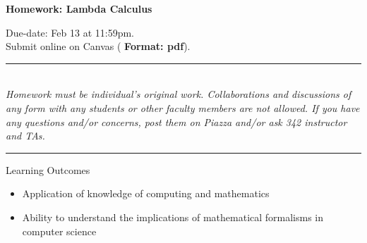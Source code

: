 \documentclass[11pt]{article}
\begin{document}
\begin{center}
{\Large\bf Homework: Lambda Calculus}

\medskip

{Due-date: Feb 13 at 11:59pm.}
\\
Submit online on Canvas (\textbf{\color{red} Format: pdf}).
\end{center}

\hrule

\textit{
\noindent
\\ Homework must be individual's original work. Collaborations and
discussions of any form with any students or other faculty members are
not allowed. If you have any questions and/or concerns, post them on
Piazza and/or ask 342 instructor and TAs.\\ 
} \hrule
\medskip


\noindent
\colorbox{timberwolf}{Learning Outcomes}
\begin{itemize}
\item Application of knowledge of computing and mathematics
\item Ability to understand the implications of mathematical formalisms
      in computer science
\end{itemize}

\medskip
\end{document}
